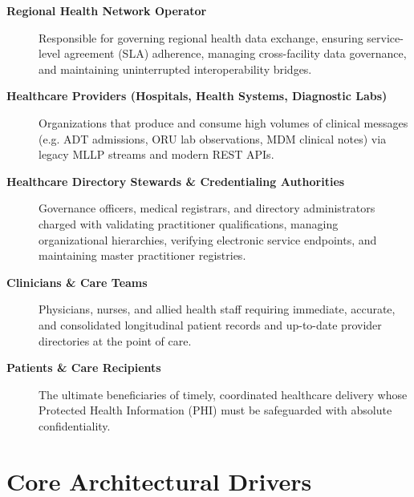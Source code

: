 \begin{description}
    \item[\textbf{Regional Health Network Operator}] Responsible for governing regional health data exchange, ensuring service-level agreement (SLA) adherence, managing cross-facility data governance, and maintaining uninterrupted interoperability bridges.
    \item[\textbf{Healthcare Providers (Hospitals, Health Systems, Diagnostic Labs)}] Organizations that produce and consume high volumes of clinical messages (e.g. ADT admissions, ORU lab observations, MDM clinical notes) via legacy MLLP streams and modern REST APIs.
    \item[\textbf{Healthcare Directory Stewards \& Credentialing Authorities}] Governance officers, medical registrars, and directory administrators charged with validating practitioner qualifications, managing organizational hierarchies, verifying electronic service endpoints, and maintaining master practitioner registries.
    \item[\textbf{Clinicians \& Care Teams}] Physicians, nurses, and allied health staff requiring immediate, accurate, and consolidated longitudinal patient records and up-to-date provider directories at the point of care.
    \item[\textbf{Patients \& Care Recipients}] The ultimate beneficiaries of timely, coordinated healthcare delivery whose Protected Health Information (PHI) must be safeguarded with absolute confidentiality.
\end{description}

\section{Core Architectural Drivers}

